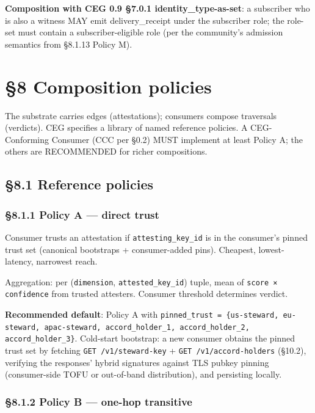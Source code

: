 \documentclass[11pt]{article}
\begin{document}
\textbf{Composition with CEG 0.9 §7.0.1 identity\_type-as-set}: a subscriber who is also a witness MAY emit delivery\_receipt under the subscriber role; the role-set must contain a subscriber-eligible role (per the community's admission semantics from §8.1.13 Policy M).




\clearpage


\section*{§8 Composition policies}


The substrate carries edges (attestations); consumers compose traversals (verdicts). CEG specifies a library of named reference policies. A CEG-Conforming Consumer (CCC per §0.2) MUST implement at least Policy A; the others are RECOMMENDED for richer compositions.


\subsection*{§8.1 Reference policies}


\subsubsection*{§8.1.1 Policy A — direct trust}


Consumer trusts an attestation if \texttt{attesting\_key\_id} is in the consumer's pinned trust set (canonical bootstraps + consumer-added pins). Cheapest, lowest-latency, narrowest reach.


Aggregation: per (\texttt{dimension}, \texttt{attested\_key\_id}) tuple, mean of \texttt{score × confidence} from trusted attesters. Consumer threshold determines verdict.


\textbf{Recommended default}: Policy A with \texttt{pinned\_trust = \{us-steward, eu-steward, apac-steward, accord\_holder\_1, accord\_holder\_2, accord\_holder\_3\}}. Cold-start bootstrap: a new consumer obtains the pinned trust set by fetching \texttt{GET /v1/steward-key} + \texttt{GET /v1/accord-holders} (§10.2), verifying the responses' hybrid signatures against TLS pubkey pinning (consumer-side TOFU or out-of-band distribution), and persisting locally.


\subsubsection*{§8.1.2 Policy B — one-hop transitive}
\end{document}
